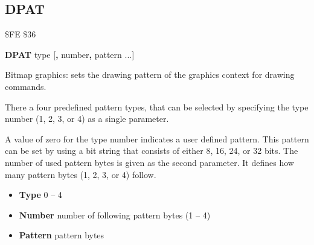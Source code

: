 \subsection{DPAT}
\begin{description}[leftmargin=2cm,style=nextline]
\item [Token:] \$FE \$36
\item [Format:] {\bf DPAT} type [{\bf,} number{\bf,} pattern ...]
\item [Usage:]
   Bitmap graphics: sets the drawing pattern
   of the graphics context for drawing commands.

   There a four predefined pattern types, that can be selected
   by specifying the type number (1, 2, 3, or 4) as a single parameter.

   A value of zero for the type number indicates a user defined pattern.
   This pattern can be set by using a bit string that consists of either 8, 16, 24, or 32 bits.
   The number of used pattern bytes is given as the second parameter.
   It defines how many pattern bytes (1, 2, 3, or 4) follow.

    \begin{itemize}
       \item {\bf Type}    0 -- 4
       \item {\bf Number}  number of following pattern bytes (1 -- 4)
       \item {\bf Pattern} pattern bytes
    \end{itemize}
\end{description}


\newpage
